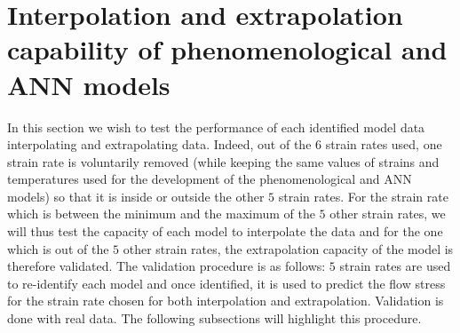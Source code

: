 \documentclass[twoside,english,1p,final,sort&compress]{elsarticle}
\theoremstyle{plain}
\begin{document}
\section{Interpolation and extrapolation capability of phenomenological and ANN models \label{sec:inExtrapolation}}
In this section we wish to test the performance of each identified model data interpolating and extrapolating data.
Indeed, out of the $6$ strain rates used, one strain rate is voluntarily removed (while keeping the same values of strains and temperatures used for the development of the phenomenological and ANN models) so that it is inside or outside the other $5$ strain rates.
For the strain rate which is between the minimum and the maximum of the $5$ other strain rates, we will thus test the capacity of each model to interpolate the data and for the one which is out of the $5$ other strain rates, the extrapolation capacity of the model is therefore validated.
The validation procedure is as follows: $5$ strain rates are used to re-identify each model and once identified, it is used to predict the flow stress for the strain rate chosen for both interpolation and extrapolation.
Validation is done with real data.
The following subsections will highlight this procedure.
\end{document}
